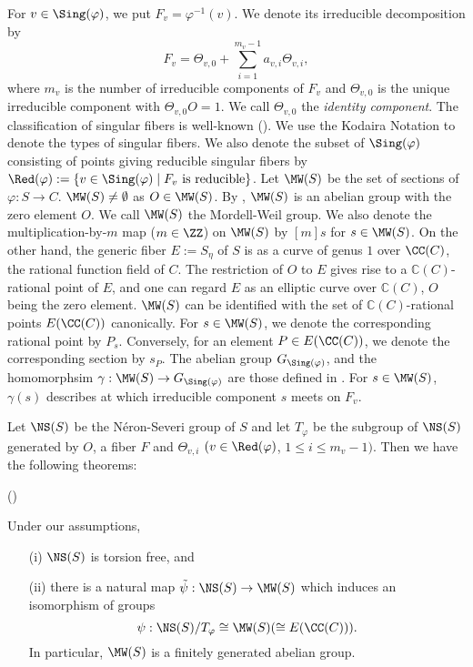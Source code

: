  For $v \in \Sing(\varphi)$, we put $F_v = \varphi^{-1}(v)$. 
 We denote its irreducible decomposition by 
 \[
 F_v = \Theta_{v, 0} + \sum_{i=1}^{m_v-1} a_{v,i}\Theta_{v,i}, 
 \]
 where $m_v$ is the number of irreducible components of $F_v$ and $\Theta_{v,0}$ is the
unique irreducible component with $\Theta_{v,0}O = 1$. We call $\Theta_{v,0}$ the {\it identity
 component}.  The classification  of singular fibers is well-known (\cite{kodaira}). We use the Kodaira Notation to denote the types of singular fibers. 
  We also denote the subset  of $\Sing(\varphi)$  consisting of points giving reducible singular fibers by
 $\Red(\varphi) := \{v \in \Sing(\varphi)\mid \mbox{$F_v$ is reducible}\}$. 
Let $\MW(S)$ be the set of sections of $\varphi : S \to C$.  $\MW(S) \neq \emptyset$ as $O \in \MW(S)$.
By \cite[Theorem 9.1]{kodaira}, $\MW(S)$  is an abelian group with the zero
element $O$. We call
$\MW(S)$  the Mordell-Weil group.   
We also denote the multiplication-by-$m$ map ($m \in \ZZ$) on
$\MW(S)$ by $[m]s$ for $s \in \MW(S)$. 
 On the other hand, the generic fiber $E:= S_{\eta}$ of
$S$ is as a curve of genus $1$ over $\CC(C)$, the rational function field of $C$. The restriction of $O$
to $E$ gives rise to a ${\mathbb C}(C)$-rational point of $E$, and one can regard $E$
as an elliptic curve over ${\mathbb C}(C)$, $O$ being the zero element. $\MW(S)$ can be identified
with the set of ${\mathbb C}(C)$-rational points $E(\CC(C))$ canonically. 
For $s \in \MW(S)$, we denote the corresponding rational point by $P_s$. 
Conversely,
for an element $P \in E(\CC(C))$,  we denote the corresponding  section by $s_P$.
  The abelian group $G_{\Sing(\varphi)}$, and the homomorphsim
$\gamma : \MW(S) \to G_{\Sing(\varphi)}$   are those defined in \cite[p. 83]{tokunaga12}.
For $s \in \MW(S)$, $\gamma(s)$ describes at which irreducible component $s$ meets on 
$F_v$. 


%
Let $\NS(S)$ be the N\'eron-Severi group of $S$ and let $T_{\varphi}$ be the 
subgroup of $\NS(S)$ generated by $O$, a fiber $F$ and  $\Theta_{v,i}$ $(v \in \Red(\varphi)$,
$1 \le i \le m_v-1)$. Then we have the following theorems:

\begin{thm}\label{thm:shioda-basic0}(\cite[Theorem~1.2, 1.3]{shioda90})
 {Under our assumptions,

\begin{enumerate}
\item[(i)] $\NS(S)$ is torsion free, and

\item[(ii)] there is a natural map $\tilde{\psi} : \NS(S) \to \MW(S)$ which induces an isomorphism of 
groups
\[
\psi : \NS(S)/T_{\varphi} \cong \MW(S) (\cong E(\CC(C))).
\]
In particular, $\MW(S)$ is a finitely generated abelian group.
\end{enumerate}
}
\end{thm}

